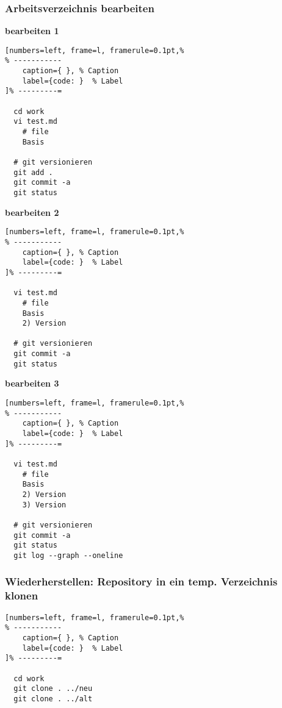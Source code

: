 \subsubsection{Arbeitsverzeichnis
bearbeiten}\label{arbeitsverzeichnis-bearbeiten}

\textbf{bearbeiten 1}

\lstset{language=Bash} %
\begin{lstlisting}[numbers=left, frame=l, framerule=0.1pt,%
% -----------
	caption={ }, % Caption
	label={code: }  % Label
]% ---------=

  cd work
  vi test.md
    # file
    Basis

  # git versionieren
  git add .
  git commit -a
  git status
\end{lstlisting}

\textbf{bearbeiten 2}

\lstset{language=Bash} %
\begin{lstlisting}[numbers=left, frame=l, framerule=0.1pt,%
% -----------
	caption={ }, % Caption
	label={code: }  % Label
]% ---------=

  vi test.md
    # file
    Basis
    2) Version

  # git versionieren
  git commit -a
  git status
\end{lstlisting}

\textbf{bearbeiten 3}

\lstset{language=Bash} %
\begin{lstlisting}[numbers=left, frame=l, framerule=0.1pt,%
% -----------
	caption={ }, % Caption
	label={code: }  % Label
]% ---------=

  vi test.md
    # file
    Basis
    2) Version
    3) Version

  # git versionieren
  git commit -a
  git status
  git log --graph --oneline
\end{lstlisting}

\subsubsection{Wiederherstellen: Repository in ein temp. Verzeichnis
klonen}\label{wiederherstellen-repository-in-ein-temp.-verzeichnis-klonen}

\lstset{language=Bash} %
\begin{lstlisting}[numbers=left, frame=l, framerule=0.1pt,%
% -----------
	caption={ }, % Caption
	label={code: }  % Label
]% ---------=

  cd work
  git clone . ../neu
  git clone . ../alt
\end{lstlisting}

